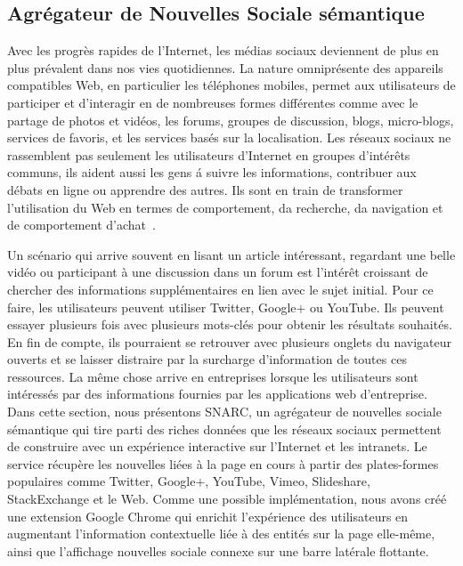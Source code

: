 \subsection{Agr\'{e}gateur de Nouvelles Sociale s\'{e}mantique}

Avec les progr\`{e}s rapides de l'Internet, les m\'{e}dias sociaux deviennent de plus en plus pr\'{e}valent dans nos vies quotidiennes. La nature omnipr\'{e}sente des appareils compatibles Web, en particulier les t\'{e}l\'{e}phones mobiles, permet aux utilisateurs de participer et d'interagir en de nombreuses formes diff\'{e}rentes comme avec le partage de photos et vid\'{e}os, les forums, groupes de discussion, blogs, micro-blogs, services de favoris, et les services bas\'{e}s sur la localisation. Les r\'{e}seaux sociaux ne rassemblent pas seulement les utilisateurs d'Internet en groupes d'int\'{e}rêts communs, ils aident aussi les gens \'a suivre les informations, contribuer aux d\'{e}bats en ligne ou apprendre des autres. Ils sont en train de transformer l'utilisation du Web en termes de comportement, da recherche, da navigation et de comportement d'achat~\cite{Bakshy:WWW:12}.

Un sc\'{e}nario qui arrive souvent en lisant un article int\'{e}ressant, regardant une belle vid\'{e}o ou participant à une discussion dans un forum est l'int\'{e}rêt croissant de chercher des informations suppl\'{e}mentaires en lien avec le sujet initial. Pour ce faire, les utilisateurs peuvent utiliser Twitter, Google+ ou YouTube. Ils peuvent essayer plusieurs fois avec plusieurs mots-cl\'{e}s pour obtenir les r\'{e}sultats souhait\'{e}s. En fin de compte, ils pourraient se retrouver avec plusieurs onglets du navigateur ouverts et se laisser distraire par la surcharge d'information de toutes ces ressources. La même chose arrive en entreprises lorsque les utilisateurs sont int\'{e}ress\'{e}s par des informations fournies par les applications web d'entreprise. Dans cette section, nous pr\'{e}sentons SNARC, un agr\'{e}gateur de nouvelles sociale s\'{e}mantique qui tire parti des riches donn\'{e}es que les r\'{e}seaux sociaux permettent de construire avec un exp\'{e}rience interactive sur l'Internet et les intranets. Le service r\'{e}cup\`{e}re les nouvelles li\'{e}es à la page en cours à partir des plates-formes populaires comme Twitter, Google+, YouTube, Vimeo, Slideshare, StackExchange et le Web. Comme une possible impl\'{e}mentation, nous avons cr\'{e}\'{e} une extension Google Chrome qui enrichit l'exp\'{e}rience des utilisateurs en augmentant l'information contextuelle li\'{e}e à des entit\'{e}s sur la page elle-même, ainsi que l'affichage nouvelles sociale connexe sur une barre lat\'{e}rale flottante.

